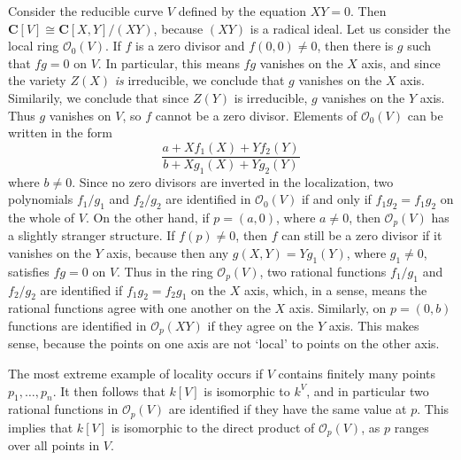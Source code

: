 \begin{example}
    Consider the reducible curve $V$ defined by the equation $XY = 0$. Then $\mathbf{C}[V] \cong \mathbf{C}[X,Y]/(XY)$, because $(XY)$ is a radical ideal. Let us consider the local ring $\mathcal{O}_0(V)$. If $f$ is a zero divisor and $f(0,0) \neq 0$, then there is $g$ such that $fg = 0$ on $V$. In particular, this means $fg$ vanishes on the $X$ axis, and since the variety $Z(X)$ {\it is} irreducible, we conclude that $g$ vanishes on the $X$ axis. Similarily, we conclude that since $Z(Y)$ is irreducible, $g$ vanishes on the $Y$ axis. Thus $g$ vanishes on $V$, so $f$ cannot be a zero divisor. Elements of $\mathcal{O}_0(V)$ can be written in the form
    \[ \frac{a + Xf_1(X) + Yf_2(Y)}{b + Xg_1(X) + Yg_2(Y)} \]
    where $b \neq 0$. Since no zero divisors are inverted in the localization, two polynomials $f_1/g_1$ and $f_2/g_2$ are identified in $\mathcal{O}_0(V)$ if and only if $f_1g_2 = f_1g_2$ on the whole of $V$. On the other hand, if $p = (a,0)$, where $a \neq 0$, then $\mathcal{O}_p(V)$ has a slightly stranger structure. If $f(p) \neq 0$, then $f$ can still be a zero divisor if it vanishes on the $Y$ axis, because then any $g(X,Y) = Yg_1(Y)$, where $g_1 \neq 0$, satisfies $fg = 0$ on $V$. Thus in the ring $\mathcal{O}_p(V)$, two rational functions $f_1/g_1$ and $f_2/g_2$ are identified if $f_1g_2 = f_2g_1$ on the $X$ axis, which, in a sense, means the rational functions agree with one another on the $X$ axis. Similarly, on $p = (0,b)$ functions are identified in $\mathcal{O}_p(XY)$ if they agree on the $Y$ axis. This makes sense, because the points on one axis are not `local' to points on the other axis.
\end{example}

\begin{example}
    The most extreme example of locality occurs if $V$ contains finitely many points $p_1, \dots, p_n$. It then follows that $k[V]$ is isomorphic to $k^V$, and in particular two rational functions in $\mathcal{O}_p(V)$ are identified if they have the same value at $p$. This implies that $k[V]$ is isomorphic to the direct product of $\mathcal{O}_p(V)$, as $p$ ranges over all points in $V$.
\end{example}

